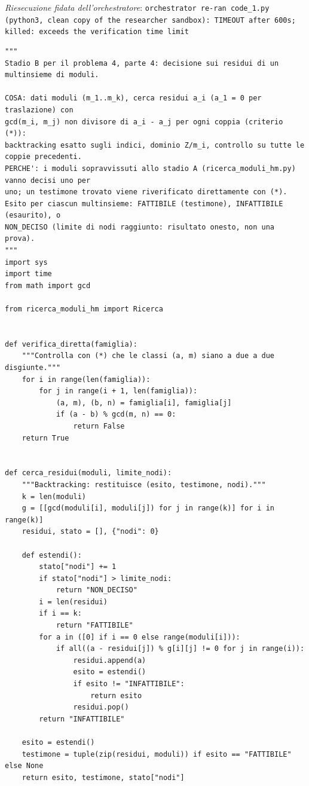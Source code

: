 \documentclass[11pt,a4paper]{article}
\begin{document}
\noindent\emph{Riesecuzione fidata dell'orchestratore}: \texttt{orchestrator re-ran code\_1.py (python3, clean copy of the researcher sandbox): TIMEOUT after 600s; killed: exceeds the verification time limit}
\begin{lstlisting}[caption={attempt\_001 code\_2 [python, rigore exact] — Stage B: for each stage-A survivor, exhaustive backtracking on residues (a\_1 = 0 by Lemma  — verdetto del Referee: UNKNOWN\_STATUS}]
"""
Stadio B per il problema 4, parte 4: decisione sui residui di un multinsieme di moduli.

COSA: dati moduli (m_1..m_k), cerca residui a_i (a_1 = 0 per traslazione) con
gcd(m_i, m_j) non divisore di a_i - a_j per ogni coppia (criterio (*)):
backtracking esatto sugli indici, dominio Z/m_i, controllo su tutte le coppie precedenti.
PERCHE': i moduli sopravvissuti allo stadio A (ricerca_moduli_hm.py) vanno decisi uno per
uno; un testimone trovato viene riverificato direttamente con (*).
Esito per ciascun multinsieme: FATTIBILE (testimone), INFATTIBILE (esaurito), o
NON_DECISO (limite di nodi raggiunto: risultato onesto, non una prova).
"""
import sys
import time
from math import gcd

from ricerca_moduli_hm import Ricerca


def verifica_diretta(famiglia):
    """Controlla con (*) che le classi (a, m) siano a due a due disgiunte."""
    for i in range(len(famiglia)):
        for j in range(i + 1, len(famiglia)):
            (a, m), (b, n) = famiglia[i], famiglia[j]
            if (a - b) % gcd(m, n) == 0:
                return False
    return True


def cerca_residui(moduli, limite_nodi):
    """Backtracking: restituisce (esito, testimone, nodi)."""
    k = len(moduli)
    g = [[gcd(moduli[i], moduli[j]) for j in range(k)] for i in range(k)]
    residui, stato = [], {"nodi": 0}

    def estendi():
        stato["nodi"] += 1
        if stato["nodi"] > limite_nodi:
            return "NON_DECISO"
        i = len(residui)
        if i == k:
            return "FATTIBILE"
        for a in ([0] if i == 0 else range(moduli[i])):
            if all((a - residui[j]) % g[i][j] != 0 for j in range(i)):
                residui.append(a)
                esito = estendi()
                if esito != "INFATTIBILE":
                    return esito
                residui.pop()
        return "INFATTIBILE"

    esito = estendi()
    testimone = tuple(zip(residui, moduli)) if esito == "FATTIBILE" else None
    return esito, testimone, stato["nodi"]



\end{lstlisting}
\end{document}
